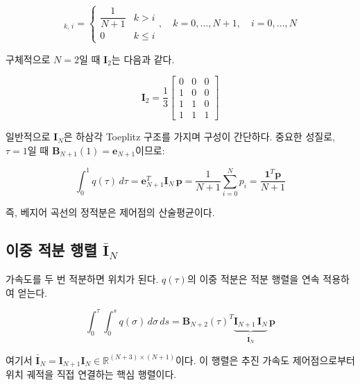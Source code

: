\documentclass[11pt]{article}
\begin{document}
\begin{equation}
  [\mathbf{I}_N]_{k,\,i} =
  \begin{cases}
    \dfrac{1}{N+1} & k > i \\[4pt]
    0              & k \leq i
  \end{cases},
  \quad k = 0,\ldots,N+1,\quad i = 0,\ldots,N
  \label{eq:IN_elements}
\end{equation}

구체적으로 $N=2$일 때 $\mathbf{I}_2$는 다음과 같다.

\begin{equation}
  \mathbf{I}_2 = \frac{1}{3}
  \begin{bmatrix}
    0 & 0 & 0 \\
    1 & 0 & 0 \\
    1 & 1 & 0 \\
    1 & 1 & 1
  \end{bmatrix}
  \label{eq:I2_example}
\end{equation}

일반적으로 $\mathbf{I}_N$은 하삼각 Toeplitz 구조를 가지며 구성이 간단하다.
중요한 성질로, $\tau=1$일 때 $\mathbf{B}_{N+1}(1) = \mathbf{e}_{N+1}$이므로:

\begin{equation}
  \int_0^1 q(\tau)\,d\tau = \mathbf{e}_{N+1}^T \mathbf{I}_N\, \mathbf{p}
  = \frac{1}{N+1}\sum_{i=0}^{N} p_i = \frac{\mathbf{1}^T \mathbf{p}}{N+1}
  \label{eq:definite_integral}
\end{equation}

즉, 베지어 곡선의 정적분은 제어점의 산술평균이다.

\subsection{이중 적분 행렬 $\bar{\mathbf{I}}_N$}

가속도를 두 번 적분하면 위치가 된다.
$q(\tau)$의 이중 적분은 적분 행렬을 연속 적용하여 얻는다.

\begin{equation}
  \int_0^\tau\!\int_0^s q(\sigma)\,d\sigma\,ds
  = \mathbf{B}_{N+2}(\tau)^T \underbrace{\mathbf{I}_{N+1}\,\mathbf{I}_N}_{\bar{\mathbf{I}}_N}\, \mathbf{p}
  \label{eq:double_integral}
\end{equation}

여기서 $\bar{\mathbf{I}}_N = \mathbf{I}_{N+1}\mathbf{I}_N \in \mathbb{R}^{(N+3)\times(N+1)}$이다.
이 행렬은 추진 가속도 제어점으로부터 위치 궤적을 직접 연결하는 핵심 행렬이다.
\end{document}
